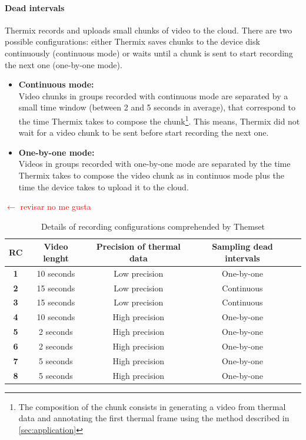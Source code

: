 \documentclass[oneside, twocolumn]{article}
\newcommand\myworries[1]{\textcolor{red}{#1}}
\begin{document}
\paragraph{Dead intervals}
Thermix records and uploads small chunks of video to the cloud. There are two possible configurations: either Thermix saves chunks to the device disk continuously (continuous mode) or waits until a chunk is sent to start recording the next one (one-by-one mode).
\begin{itemize}
	\item \textbf{Continuous mode:}\\
		Video chunks in groups recorded with continuous mode are separated by a small time window (between 2 and 5 seconds in average), that correspond to the time Thermix takes to compose the chunk\footnote{The composition of the chunk consists in generating a video from thermal data and annotating the first thermal frame using the method described in \autoref{sec:application}}. This means, Thermix did not wait for a video chunk to be sent before start recording the next one.\\
	\item \textbf{One-by-one mode:}\\
		Videos in groups recorded with one-by-one mode are separated by the time Thermix takes to compose the video chunk as in continuos mode plus the time the device takes to upload it to the cloud.
\end{itemize} \myworries{$\leftarrow$ revisar no me gusta}

\begin{table}[t]
  \centering
\begin{tabular}{c*{4}{c}}
\hline
\textbf{RC} & Video lenght & Precision of thermal data & Sampling dead intervals\\
\hline
\textbf{1} & 10 seconds & Low precision 		& One-by-one \\
\textbf{2} & 15 seconds & Low precision 		& Continuous \\
\textbf{3} & 15 seconds & Low precision 		& Continuous \\
\textbf{4} & 10 seconds & High precision 	& One-by-one \\
\textbf{5} & 2 seconds  & High precision 	& One-by-one \\
\textbf{6} & 2 seconds  & High precision 	& One-by-one \\
\textbf{7} & 5 seconds  & High precision 	& One-by-one \\
\textbf{8} & 5 seconds  & High precision 	& One-by-one \\
\hline
\end{tabular}
  \caption{Details of recording configurations comprehended by Themset}
  \label{tab:1}
\end{table}
\end{document}
